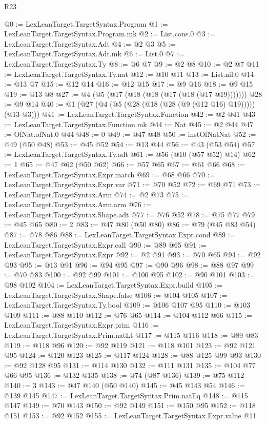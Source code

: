 \begin{lexlean}{R23}
\begin{coremodule}
@0 := LexLeanTarget.TargetSyntax.Program
@1 := LexLeanTarget.TargetSyntax.Program.mk
@2 := List.cons.{0}
@3 := LexLeanTarget.TargetSyntax.Adt
@4 := @2 @3
@5 := LexLeanTarget.TargetSyntax.Adt.mk
@6 := List.{0}
@7 := LexLeanTarget.TargetSyntax.Ty
@8 := @6 @7
@9 := @2 @8
@10 := @2 @7
@11 := LexLeanTarget.TargetSyntax.Ty.nat
@12 := @10 @11
@13 := List.nil.{0}
@14 := @13 @7
@15 := @12 @14
@16 := @12 @15
@17 := @9 @16
@18 := @9 @15
@19 := @13 @8
@27 := @4 (@5 (@17 (@18 (@18 (@17 (@18 (@17 @19)))))))
@28 := @9 @14
@40 := @1 (@27 (@4 (@5 (@28 (@18 (@28 (@9 (@12 @16) @19))))) (@13 @3)))
@41 := LexLeanTarget.TargetSyntax.Function
@42 := @2 @41
@43 := LexLeanTarget.TargetSyntax.Function.mk
@44 := Nat
@45 := @2 @44
@47 := OfNat.ofNat.{0} @44
@48 := 0
@49 := @47 @48
@50 := instOfNatNat
@52 := @49 (@50 @48)
@53 := @45 @52
@54 := @13 @44
@56 := @43 (@53 @54)
@57 := LexLeanTarget.TargetSyntax.Ty.adt
@61 := @56 (@10 (@57 @52) @14)
@62 := 1
@65 := @47 @62 (@50 @62)
@66 := @57 @65
@67 := @61 @66
@68 := LexLeanTarget.TargetSyntax.Expr.match
@69 := @68 @66
@70 := LexLeanTarget.TargetSyntax.Expr.var
@71 := @70 @52
@72 := @69 @71
@73 := LexLeanTarget.TargetSyntax.Arm
@74 := @2 @73
@75 := LexLeanTarget.TargetSyntax.Arm.arm
@76 := LexLeanTarget.TargetSyntax.Shape.adt
@77 := @76 @52
@78 := @75 @77
@79 := @45 @65
@80 := 2
@83 := @47 @80 (@50 @80)
@86 := @79 (@45 @83 @54)
@87 := @78 @86
@88 := LexLeanTarget.TargetSyntax.Expr.cond
@89 := LexLeanTarget.TargetSyntax.Expr.call
@90 := @89 @65
@91 := LexLeanTarget.TargetSyntax.Expr
@92 := @2 @91
@93 := @70 @65
@94 := @92 @93
@95 := @13 @91
@96 := @94 @95
@97 := @90 @96
@98 := @88 @97
@99 := @70 @83
@100 := @92 @99
@101 := @100 @95
@102 := @90 @101
@103 := @98 @102
@104 := LexLeanTarget.TargetSyntax.Expr.build
@105 := LexLeanTarget.TargetSyntax.Shape.false
@106 := @104 @105
@107 := LexLeanTarget.TargetSyntax.Ty.bool
@109 := @106 @107 @95
@110 := @103 @109
@111 := @88 @110
@112 := @76 @65
@114 := @104 @112 @66
@115 := LexLeanTarget.TargetSyntax.Expr.prim
@116 := LexLeanTarget.TargetSyntax.Prim.natLt
@117 := @115 @116
@118 := @89 @83
@119 := @118 @96
@120 := @92 @119
@121 := @118 @101
@123 := @92 @121 @95
@124 := @120 @123
@125 := @117 @124
@128 := @88 @125 @99 @93
@130 := @92 @128 @95
@131 := @114 @130
@132 := @111 @131
@135 := @104 @77 @66 @95
@136 := @132 @135
@138 := @74 (@87 @136)
@139 := @75 @112
@140 := 3
@143 := @47 @140 (@50 @140)
@145 := @45 @143 @54
@146 := @139 @145
@147 := LexLeanTarget.TargetSyntax.Prim.natEq
@148 := @115 @147
@149 := @70 @143
@150 := @92 @149
@151 := @150 @95
@152 := @118 @151
@153 := @92 @152
@155 := LexLeanTarget.TargetSyntax.Expr.value @11

\end{coremodule}
\end{lexlean}
